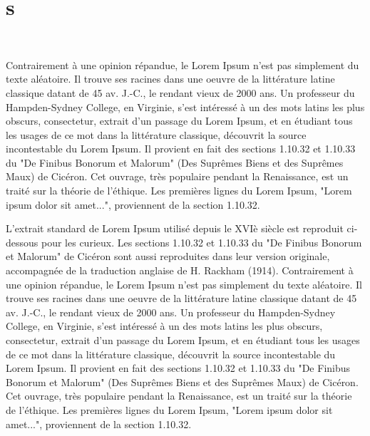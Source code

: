 \documentclass{book}
\begin{document}
\chapter{s}

\beginnumbering
\pstart
~




Contrairement à une opinion répandue, le Lorem Ipsum n'est pas simplement du texte aléatoire. Il trouve ses racines dans une oeuvre de la littérature latine classique datant de 45 av. J.-C., le rendant vieux de 2000 ans.  Un professeur du Hampden-Sydney College, en Virginie, s'est intéressé à un des mots latins les plus obscurs, consectetur, extrait d'un passage du Lorem Ipsum, et en étudiant tous les usages de ce mot dans la littérature classique, découvrit la source incontestable du Lorem Ipsum. Il provient en fait des sections 1.10.32 et 1.10.33 du "De Finibus Bonorum et Malorum" (Des Suprêmes Biens et des Suprêmes Maux) de Cicéron. Cet ouvrage, très populaire pendant la Renaissance, est un traité sur la théorie de l'éthique. Les premières lignes du Lorem Ipsum, "Lorem ipsum dolor sit amet...", proviennent de la section 1.10.32.



L'extrait standard de Lorem Ipsum utilisé depuis le XVIè siècle est reproduit ci-dessous pour les curieux. Les sections 1.10.32 et 1.10.33 du "De Finibus Bonorum et Malorum" de Cicéron sont aussi reproduites dans leur version originale, accompagnée de la traduction anglaise de H. Rackham (1914).
Contrairement à une opinion répandue, le Lorem Ipsum n'est pas simplement du texte aléatoire. Il trouve ses racines dans une oeuvre de la littérature latine classique datant de 45 av. J.-C., le rendant vieux de 2000 ans. Un professeur du Hampden-Sydney College, en Virginie, s'est intéressé à un des mots latins les plus obscurs, consectetur, extrait d'un passage du Lorem Ipsum, et en étudiant tous les usages de ce mot dans la littérature classique, découvrit la source incontestable du Lorem Ipsum. Il provient en fait des sections 1.10.32 et 1.10.33 du "De Finibus Bonorum et Malorum" (Des Suprêmes Biens et des Suprêmes Maux) de Cicéron. Cet ouvrage, très populaire pendant la Renaissance, est un traité sur la théorie de l'éthique. Les premières lignes du Lorem Ipsum, "Lorem ipsum dolor sit amet...", proviennent de la section 1.10.32.
\end{document}
